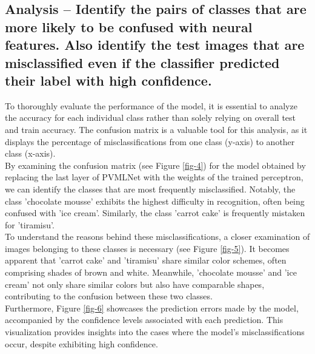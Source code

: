 \documentclass{class}
\begin{document}
\subsection{Analysis -- Identify the pairs of classes that are more likely to be confused with neural features.
    Also identify the test images that are misclassified even if the classifier predicted their
    label with high confidence.}
To thoroughly evaluate the performance of the model, it is essential to analyze the accuracy for each individual class rather than
solely relying on overall test and train accuracy.
The confusion matrix is a valuable tool for this analysis, as it displays the percentage of misclassifications from one class (y-axis) to another class (x-axis).\\
By examining the confusion matrix (see Figure \ref{fig-4}) for the model obtained by replacing the last layer of PVMLNet
with the weights of the trained perceptron, we can identify the classes that are most frequently misclassified.
Notably, the class 'chocolate mousse' exhibits the highest difficulty in recognition, often being confused with 'ice cream'.
Similarly, the class 'carrot cake' is frequently mistaken for 'tiramisu'.\\
To understand the reasons behind these misclassifications, a closer examination of images belonging to these classes is necessary
(see Figure \ref{fig-5}). It becomes apparent that 'carrot cake' and 'tiramisu' share similar color schemes, often comprising shades of brown and white.
Meanwhile, 'chocolate mousse' and 'ice cream' not only share similar colors but also have comparable shapes, contributing to the confusion between these two classes.\\
Furthermore, Figure \ref{fig-6} showcases the prediction errors made by the model, accompanied by the confidence levels associated with each prediction.
This visualization provides insights into the cases where the model's misclassifications occur, despite exhibiting high confidence.
\end{document}
